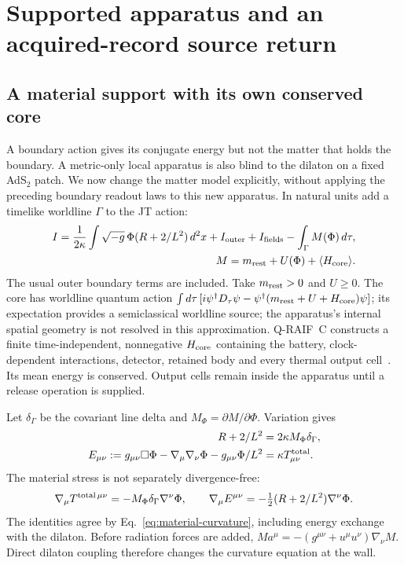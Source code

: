 \section{Supported apparatus and an acquired-record source return}
\label{app:material-return}

\subsection{A material support with its own conserved core}
\label{sec:material-support}

A boundary action gives its conjugate energy but not the matter that holds
the boundary. A metric-only local apparatus is also blind to the dilaton
on a fixed AdS$_2$ patch. We now change the matter model explicitly,
without applying the preceding boundary readout laws to this new apparatus.
In natural units add a timelike worldline $\Gamma$ to the JT action:
\begin{align}\label{eq:material-action}
 I=\frac1{2\kappa}\int\sqrt{-g}\,\Phi(R+2/L^2)\,d^2x
       +I_{\rm outer}+I_{\rm fields}-\int_\Gamma M(\Phi)\,d\tau,&\nonumber\\
 M=m_{\rm rest}+U(\Phi)+\langle H_{\rm core}\rangle.&
\end{align}
The usual outer boundary terms are included. Take $m_{\rm rest}>0$ and
$U\ge0$. The core has worldline quantum action
$\int d\tau\,[i\psi^\dagger D_\tau\psi-
\psi^\dagger(m_{\rm rest}+U+H_{\rm core})\psi]$; its expectation
provides a semiclassical worldline source; the apparatus's internal spatial
geometry is not resolved in this approximation. Q-RAIF~C constructs a finite
time-independent, nonnegative $H_{\rm core}$ containing the battery,
clock-dependent interactions, detector, retained body and every thermal
output cell~\cite{QRC}. Its mean energy is conserved. Output cells remain
inside the apparatus until a release operation is supplied.

Let $\delta_\Gamma$ be the covariant line delta and
$M_\Phi=\partial M/\partial\Phi$. Variation gives
\begin{align}
 R+2/L^2&=2\kappa M_\Phi\delta_\Gamma,
       \label{eq:material-curvature}\\
 E_{\mu\nu}:=g_{\mu\nu}\Box\Phi-\nabla_\mu\nabla_\nu\Phi
                     -g_{\mu\nu}\Phi/L^2
       &=\kappa T^{\rm total}_{\mu\nu}.
       \label{eq:material-metric}
\end{align}
The material stress is not separately divergence-free:
\begin{equation}\label{eq:material-ward}
 \nabla_\mu T^{{\rm total}\,\mu\nu}
       =-M_\Phi\delta_\Gamma\nabla^\nu\Phi,
 \qquad
 \nabla_\mu E^{\mu\nu}
       =-\tfrac12(R+2/L^2)\nabla^\nu\Phi.
\end{equation}
The identities agree by Eq.~\eqref{eq:material-curvature}, including
energy exchange with the dilaton. Before radiation forces are added,
$M a^\mu=-(g^{\mu\nu}+u^\mu u^\nu)\nabla_\nu M$.
Direct dilaton coupling therefore changes the curvature equation at the wall.

